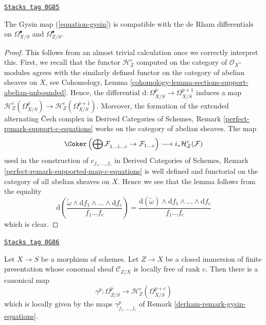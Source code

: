 \begin{lemma}
\label{derham-lemma-gysin-differential}
\href{https://stacks.math.columbia.edu/tag/0G85}{\texttt{Stacks tag 0G85}}

The Gysin map (\ref{equation-gysin}) is compatible with the de Rham
differentials on $\Omega^\bullet_{X/S}$ and $\Omega^\bullet_{Z/S}$.
\end{lemma}

\begin{proof}
This follows from an almost trivial calculation once
we correctly interpret this. First, we recall that the functor
$\mathcal{H}^c_Z$ computed on the category of $\mathcal{O}_X$-modules
agrees with the similarly defined functor on the category of abelian
sheaves on $X$, see
Cohomology, Lemma \ref{cohomology-lemma-sections-support-abelian-unbounded}.
Hence, the differential $\text{d} : \Omega^p_{X/S} \to \Omega^{p + 1}_{X/S}$
induces a map
$\mathcal{H}^c_Z(\Omega^p_{X/S}) \to \mathcal{H}^c_Z(\Omega^{p + 1}_{X/S})$.
Moreover, the formation of the extended alternating {\v C}ech complex in
Derived Categories of Schemes, Remark \ref{perfect-remark-support-c-equations}
works on the category of abelian sheaves. The map
$$
\Coker\left(\bigoplus \mathcal{F}_{1 \ldots \hat i \ldots c} \to
\mathcal{F}_{1 \ldots c}\right)
\longrightarrow
i_*\mathcal{H}^c_Z(\mathcal{F})
$$
used in the construction of $c_{f_1, \ldots, f_c}$ in
Derived Categories of Schemes, Remark
\ref{perfect-remark-supported-map-c-equations}
is well defined and
functorial on the category of all abelian sheaves on $X$.
Hence we see that the lemma follows from the equality
$$
\text{d}\left(
\frac{\tilde \omega \wedge \text{d}f_1 \wedge \ldots \wedge
\text{d}f_c}{f_1 \ldots f_c}\right) =
\frac{\text{d}(\tilde \omega) \wedge
\text{d}f_1 \wedge \ldots \wedge \text{d}f_c}{f_1 \ldots f_c}
$$
which is clear.
\end{proof}

\begin{lemma}
\label{derham-lemma-gysin-global}
\href{https://stacks.math.columbia.edu/tag/0G86}{\texttt{Stacks tag 0G86}}

Let $X \to S$ be a morphism of schemes. Let $Z \to X$ be a closed immersion
of finite presentation whose conormal sheaf $\mathcal{C}_{Z/X}$ is
locally free of rank $c$. Then there is a canonical map
$$
\gamma^p : \Omega^p_{Z/S} \to \mathcal{H}^c_Z(\Omega^{p + c}_{X/S})
$$
which is locally given by the maps $\gamma^p_{f_1, \ldots, f_c}$
of Remark \ref{derham-remark-gysin-equations}.
\end{lemma}

